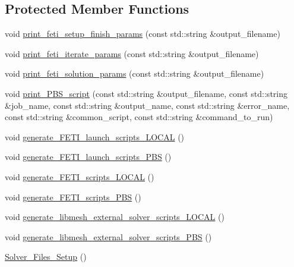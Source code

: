 \subsection*{Protected Member Functions}
\begin{DoxyCompactItemize}
\item 
void \hyperlink{classcarl_1_1_solver___files___setup_a32a0af7880856a835f42c60d2c4e2346}{print\+\_\+feti\+\_\+setup\+\_\+finish\+\_\+params} (const std\+::string \&output\+\_\+filename)
\item 
void \hyperlink{classcarl_1_1_solver___files___setup_aa83ae1990ac5fd3203004155d139b679}{print\+\_\+feti\+\_\+iterate\+\_\+params} (const std\+::string \&output\+\_\+filename)
\item 
void \hyperlink{classcarl_1_1_solver___files___setup_abd020d2636217f7bebace1d2b484643f}{print\+\_\+feti\+\_\+solution\+\_\+params} (const std\+::string \&output\+\_\+filename)
\item 
void \hyperlink{classcarl_1_1_solver___files___setup_a75c99aedd9396118e908379bb975ddac}{print\+\_\+\+P\+B\+S\+\_\+script} (const std\+::string \&output\+\_\+filename, const std\+::string \&job\+\_\+name, const std\+::string \&output\+\_\+name, const std\+::string \&error\+\_\+name, const std\+::string \&common\+\_\+script, const std\+::string \&command\+\_\+to\+\_\+run)
\item 
void \hyperlink{classcarl_1_1_solver___files___setup_a9dc4e3db9c7ca5dcced4b05b39f1856e}{generate\+\_\+\+F\+E\+T\+I\+\_\+launch\+\_\+scripts\+\_\+\+L\+O\+C\+A\+L} ()
\item 
void \hyperlink{classcarl_1_1_solver___files___setup_a8dadd76a428f56e5cedc92f6512921e7}{generate\+\_\+\+F\+E\+T\+I\+\_\+launch\+\_\+scripts\+\_\+\+P\+B\+S} ()
\item 
void \hyperlink{classcarl_1_1_solver___files___setup_a6508a02d34e9c211cf1f94816fc0481e}{generate\+\_\+\+F\+E\+T\+I\+\_\+scripts\+\_\+\+L\+O\+C\+A\+L} ()
\item 
void \hyperlink{classcarl_1_1_solver___files___setup_aa560da8b919addc4b70da138a5327ed7}{generate\+\_\+\+F\+E\+T\+I\+\_\+scripts\+\_\+\+P\+B\+S} ()
\item 
void \hyperlink{classcarl_1_1_solver___files___setup_a3e19e64d4cc95a5de5b2b940358a91d2}{generate\+\_\+libmesh\+\_\+external\+\_\+solver\+\_\+scripts\+\_\+\+L\+O\+C\+A\+L} ()
\item 
void \hyperlink{classcarl_1_1_solver___files___setup_adcdae16354281842a915e002cffd1d61}{generate\+\_\+libmesh\+\_\+external\+\_\+solver\+\_\+scripts\+\_\+\+P\+B\+S} ()
\item 
\hyperlink{classcarl_1_1_solver___files___setup_a2e6f471c6939cec5fe73813af0379703}{Solver\+\_\+\+Files\+\_\+\+Setup} ()
\end{DoxyCompactItemize}
